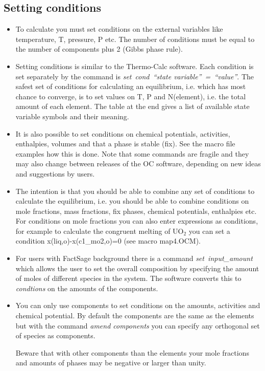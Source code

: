 \documentclass[12pt]{article}
\begin{document}
\subsection{Setting conditions}

\begin{itemize}
\item To calculate you must set conditions on the external variables
  like temperature, T, pressure, P etc.  The number of conditions must
  be equal to the number of components plus 2 (Gibbs phase rule).

\item Setting conditions is similar to the Thermo-Calc software.  Each
  condition is set separately by the command is {\em set~cond~``state
    variable''~=~``value''}.  The safest set of conditions for
  calculating an equilibrium, i.e. which has most chance to converge,
  is to set values on T, P and N(element), i.e. the total amount of
  each element.  The table at the end gives a list of available state
  variable symbols and their meaning.

\item It is also possible to set conditions on chemical potentials,
  activities, enthalpies, volumes and that a phase is stable (fix).
  See the macro file examples how this is done.  Note that some
  commands are fragile and they may also change between releases of
  the OC software, depending on new ideas and suggestions by users.

\item The intention is that you should be able to combine any set of
  conditions to calculate the equilibrium, i.e. you should be able to
  combine conditions on mole fractions, mass fractions, fix phases,
  chemical potentials, enthalpies etc.  For conditions on mole
  fractions you can also enter expressions as conditions, for example
  to calculate the congruent melting of UO$_2$ you can set a condition
  x(liq,o)-x(c1\_mo2,o)=0 (see macro map4.OCM).

\item For users with FactSage background there is a command {\em
  set~input\_amount} which allows the user to set the overall
  composition by specifying the amount of moles of different species
  in the system.  The software converts this to {\em condtions} on the
  amounts of the components.

\item You can only use components to set conditions on the amounts,
  activities and chemical potential.   By default the components are
  the same as the elements but with the command {\em amend components}
  you can specify any orthogonal set of species as components.

  Beware that with other components than the elements your mole
  fractions and amounts of phases may be negative or larger than
  unity.

\end{itemize}
\end{document}

